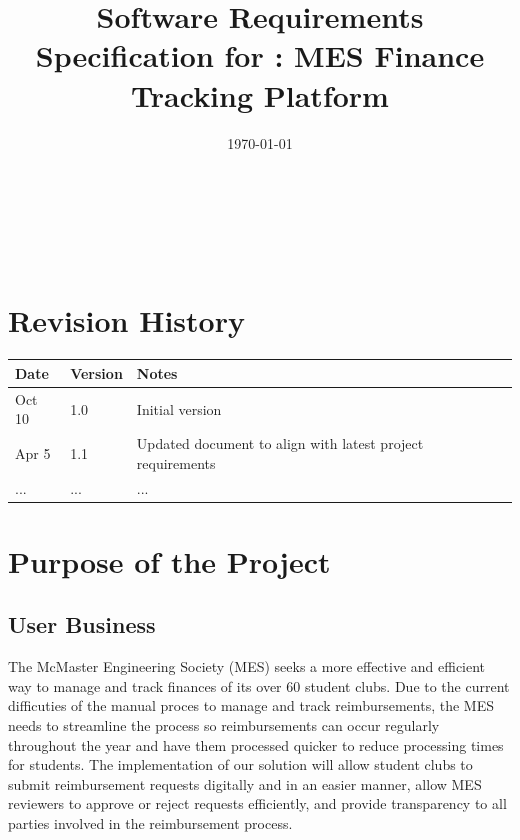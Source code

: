 \documentclass[12pt]{article}
\begin{document}
\title{Software Requirements Specification for \progname: MES Finance Tracking Platform} 
\author{\authname}
\date{\today}
	
\maketitle

~\newpage


\tableofcontents

~\newpage

\section*{Revision History}

\begin{tabularx}{\textwidth}{p{3cm}p{2cm}X}
  \toprule {\bf Date} & {\bf Version} & {\bf Notes}\\
    \midrule
      Oct 10 & 1.0 & Initial version\\
      Apr 5 & 1.1 & Updated document to align with latest project requirements\\
       ... & ... & ...\\
  \bottomrule
\end{tabularx}

\newpage
{}


\section{Purpose of the Project}
  \subsection{User Business}
    The McMaster Engineering Society (MES) seeks a more effective and efficient way to manage and track finances of its over 60 student clubs. Due to the current difficuties of 
    the manual proces to manage and track reimbursements, the MES needs to streamline the process so reimbursements can occur regularly throughout the year and have them processed
    quicker to reduce processing times for students. The implementation of our solution will allow student clubs to submit reimbursement requests digitally and in an easier manner, 
    allow MES reviewers to approve or reject requests efficiently, and provide transparency to all parties involved in the reimbursement process. 
\end{document}
